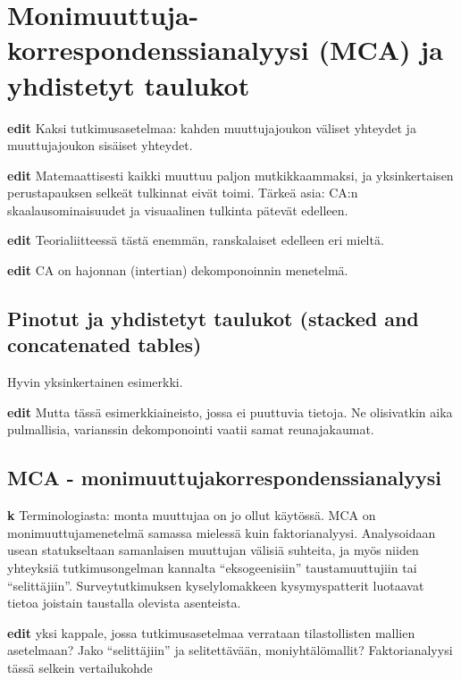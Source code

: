 \documentclass[
  finnish,
]{book}
\begin{document}
\hypertarget{monimuuttuja-korrespondenssianalyysi-mca-ja-yhdistetyt-taulukot}{%
\chapter{Monimuuttuja-korrespondenssianalyysi (MCA) ja yhdistetyt
taulukot}\label{monimuuttuja-korrespondenssianalyysi-mca-ja-yhdistetyt-taulukot}}

\textbf{edit} Kaksi tutkimusasetelmaa: kahden muuttujajoukon väliset
yhteydet ja muuttujajoukon sisäiset yhteydet.

\textbf{edit} Matemaattisesti kaikki muuttuu paljon mutkikkaammaksi, ja
yksinkertaisen perustapauksen selkeät tulkinnat eivät toimi. Tärkeä
asia: CA:n skaalausominaisuudet ja visuaalinen tulkinta pätevät
edelleen.

\textbf{edit} Teorialiitteessä tästä enemmän, ranskalaiset edelleen eri
mieltä.

\textbf{edit} CA on hajonnan (intertian) dekomponoinnin menetelmä.

\hypertarget{pinotut-ja-yhdistetyt-taulukot-stacked-and-concatenated-tables}{%
\section{Pinotut ja yhdistetyt taulukot (stacked and concatenated
tables)}\label{pinotut-ja-yhdistetyt-taulukot-stacked-and-concatenated-tables}}

Hyvin yksinkertainen esimerkki.

\textbf{edit} Mutta tässä esimerkkiaineisto, jossa ei puuttuvia tietoja.
Ne olisivatkin aika pulmallisia, varianssin dekomponointi vaatii samat
reunajakaumat.

\hypertarget{mca---monimuuttujakorrespondenssianalyysi}{%
\section{MCA -
monimuuttujakorrespondenssianalyysi}\label{mca---monimuuttujakorrespondenssianalyysi}}

\textbf{k} Terminologiasta: monta muuttujaa on jo ollut käytössä. MCA on
monimuuttujamenetelmä samassa mielessä kuin faktorianalyysi.
Analysoidaan usean statukseltaan samanlaisen muuttujan välisiä suhteita,
ja myös niiden yhteyksiä tutkimusongelman kannalta ``eksogeenisiin''
taustamuuttujiin tai ``selittäjiin''. Surveytutkimuksen kyselylomakkeen
kysymyspatterit luotaavat tietoa joistain taustalla olevista asenteista.

\textbf{edit} yksi kappale, jossa tutkimusasetelmaa verrataan
tilastollisten mallien asetelmaan? Jako ``selittäjiin'' ja
selitettävään, moniyhtälömallit? Faktorianalyysi tässä selkein
vertailukohde
\end{document}
